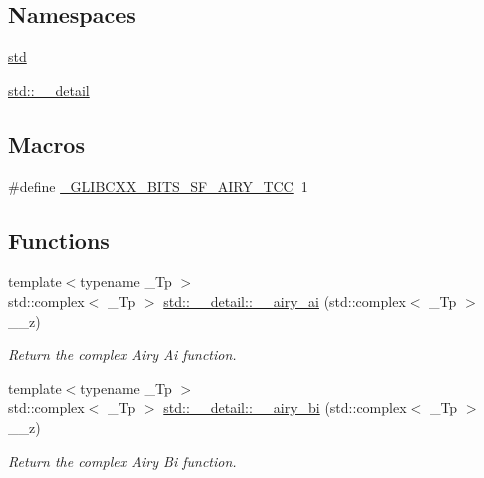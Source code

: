 \subsection*{Namespaces}
\begin{DoxyCompactItemize}
\item 
 \hyperlink{namespacestd}{std}
\item 
 \hyperlink{namespacestd_1_1____detail}{std\+::\+\_\+\+\_\+detail}
\end{DoxyCompactItemize}
\subsection*{Macros}
\begin{DoxyCompactItemize}
\item 
\#define \hyperlink{sf__airy_8tcc_a2368d5b1edfb2e14f2c283d87ab89943}{\+\_\+\+G\+L\+I\+B\+C\+X\+X\+\_\+\+B\+I\+T\+S\+\_\+\+S\+F\+\_\+\+A\+I\+R\+Y\+\_\+\+T\+CC}~1
\end{DoxyCompactItemize}
\subsection*{Functions}
\begin{DoxyCompactItemize}
\item 
{\footnotesize template$<$typename \+\_\+\+Tp $>$ }\\std\+::complex$<$ \+\_\+\+Tp $>$ \hyperlink{namespacestd_1_1____detail_afd48b5702344f832a250922ac4ffb917}{std\+::\+\_\+\+\_\+detail\+::\+\_\+\+\_\+airy\+\_\+ai} (std\+::complex$<$ \+\_\+\+Tp $>$ \+\_\+\+\_\+z)
\begin{DoxyCompactList}\small\item\em Return the complex Airy Ai function. \end{DoxyCompactList}\item 
{\footnotesize template$<$typename \+\_\+\+Tp $>$ }\\std\+::complex$<$ \+\_\+\+Tp $>$ \hyperlink{namespacestd_1_1____detail_ae5536305d721e393efe1a74f0e57653e}{std\+::\+\_\+\+\_\+detail\+::\+\_\+\+\_\+airy\+\_\+bi} (std\+::complex$<$ \+\_\+\+Tp $>$ \+\_\+\+\_\+z)
\begin{DoxyCompactList}\small\item\em Return the complex Airy Bi function. \end{DoxyCompactList}\end{DoxyCompactItemize}
